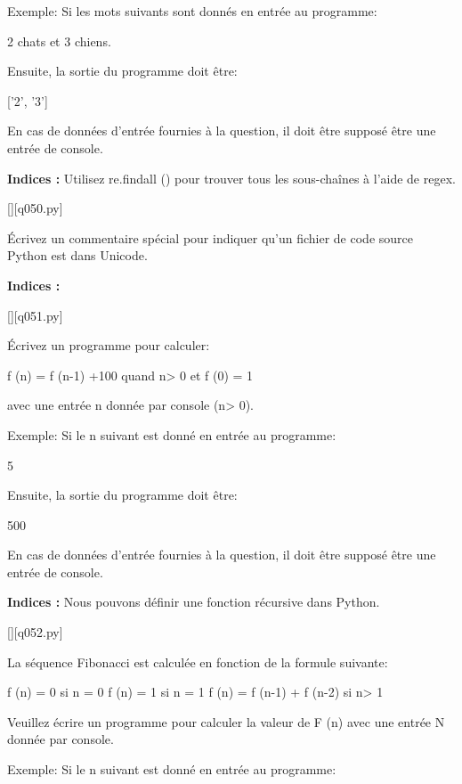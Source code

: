 Exemple:
Si les mots suivants sont donnés en entrée au programme:

2 chats et 3 chiens.

Ensuite, la sortie du programme doit être:

['2', '3']

En cas de données d'entrée fournies à la question, il doit être supposé être une entrée de console.
\par
\textbf{Indices : }Utilisez re.findall () pour trouver tous les sous-chaînes à l'aide de regex.
\renewcommand{\nomfichier}{q050.py}
\begin{solution}
    \pythonfile{\chemincode \nomfichier}[][\nomfichier]
\end{solution}


\question
Écrivez un commentaire spécial pour indiquer qu'un fichier de code source Python est dans Unicode.
\par
\textbf{Indices : }
\renewcommand{\nomfichier}{q051.py}
\begin{solution}
    \pythonfile{\chemincode \nomfichier}[][\nomfichier]
\end{solution}


\question
Écrivez un programme pour calculer:

f (n) = f (n-1) +100 quand n> 0
et f (0) = 1

avec une entrée n donnée par console (n> 0).

Exemple:
Si le n suivant est donné en entrée au programme:

5

Ensuite, la sortie du programme doit être:

500

En cas de données d'entrée fournies à la question, il doit être supposé être une entrée de console.
\par
\textbf{Indices : }Nous pouvons définir une fonction récursive dans Python.
\renewcommand{\nomfichier}{q052.py}
\begin{solution}
    \pythonfile{\chemincode \nomfichier}[][\nomfichier]
\end{solution}


\question
La séquence Fibonacci est calculée en fonction de la formule suivante:


f (n) = 0 si n = 0
f (n) = 1 si n = 1
f (n) = f (n-1) + f (n-2) si n> 1

Veuillez écrire un programme pour calculer la valeur de F (n) avec une entrée N donnée par console.

Exemple:
Si le n suivant est donné en entrée au programme:

